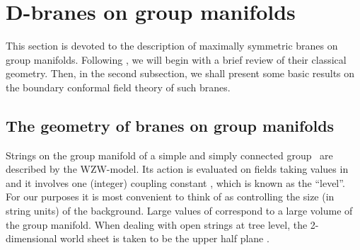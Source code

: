 \documentclass[12pt,a4paper]{article}
\def\QC{\mathbb{C}}
\begin{document}
\section{D-branes on group manifolds}

This section is devoted to the description of maximally 
symmetric branes on group manifolds. Following \cite{Alekseev:1998mc,
Felder:1999ka}, we will begin with a brief review of their classical 
geometry. Then, in the second subsection, we shall present 
some basic results on the boundary conformal field theory 
of such branes.    

\subsection{The geometry of branes on group manifolds}

Strings on the group manifold of a simple and simply connected 
group~\coordHE{} are described by the WZW-model. Its action is evaluated on 
fields \coordHE{} taking values in~\coordHE{} and it involves 
one (integer) coupling constant \coordHE{}, which is known as the ``level''. 
For our purposes it is most convenient to think of \coordHE{} as controlling 
the size (in string units) of the background. Large values of \coordHE{} 
correspond to a large volume of the group manifold. When dealing 
with open strings at tree level, the 2-dimensional world sheet 
\myHighlight{$\Sigma$}\coordHE{} is taken to be the upper half plane \myHighlight{$\Sigma = \{ z \in 
\QC | \Im z \geq 0\}$}\coordHE{}. 
\smallskip
\end{document}
